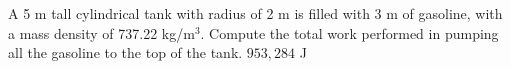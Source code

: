 {A 5 m tall cylindrical tank with radius of 2 m is filled with 3 m of gasoline, with a mass density of 737.22 kg/m$^3$. Compute the total work performed in pumping all the gasoline to the top of the tank. 
}
{$953,284$ J}

